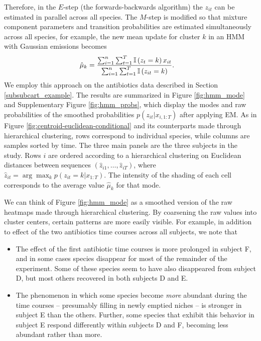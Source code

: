 \documentclass[14pt]{extarticle}
\begin{document}
Therefore, in the $E$-step (the forwards-backwards algorithm) the $z_{it}$ can
be estimated in parallel across all species. The $M$-step is modified so that
mixture component parameters and transition probabilities are estimated
simultaneously across all species, for example, the new mean update for cluster
$k$ in an HMM with Gaussian emissions becomes
\begin{align*}
\hat{\mu}_{k} &= \frac{\sum_{i = 1}^{n}\sum_{t = 1}^{T} \mathbb{I}\left({z_{t} = k}\right)x_{it}}{\sum_{i = 1}^{n}\sum_{t = 1}^{T} \mathbb{I}\left({z_{it} = k}\right)}.
\end{align*}
We employ this approach on the antibiotics data described in Section
\ref{subsubcart_example}. The results are summarized in Figure
\ref{fig:hmm_mode} and Supplementary Figure \ref{fig:hmm_probs}, which display
the modes and raw probabilities of the smoothed probabilities $p\left(z_{it}
\vert x_{i, 1:T}\right)$ after applying EM. As in Figure
\ref{fig:centroid-euclidean-conditional} and its counterparts made through
hierarchical clustering, rows correspond to individual species, while columns
are samples sorted by time. The three main panels are the three subjects in the
study. Rows $i$ are ordered according to a hierarchical clustering on Euclidean
distances between sequences $\left(\hat{z}_{i1}, \dots, \hat{z}_{iT}\right)$,
where $\hat{z}_{it} = \arg \max_{k} p\left(z_{it} = k \vert x_{1:T}\right)$. The
intensity of the shading of each cell corresponds to the average value
$\hat{\mu}_{k}$ for that mode.

We can think of Figure \ref{fig:hmm_mode} as a smoothed version of the raw
heatmaps made through hierarchical clustering. By coarsening the raw values into
cluster centers, certain patterns are more easily visible. For example, in
addition to effect of the two antibiotics time courses across all subjects, we
note that

\begin{itemize}
\item The effect of the first antibiotic time courses is more prolonged in
  subject F, and in some cases species disappear for most of the remainder of
  the experiment. Some of these species seem to have also disappeared from
  subject D, but most others recovered in both subjects D and E.
\item The phenomenon in which some species become \textit{more} abundant during
  the time courses -- presumably filling in newly emptied niches -- is stronger
  in subject E than the others. Further, some species that exhibit this behavior
  in subject E respond differently within subjects D and F, becoming less
  abundant rather than more.
\end{itemize}
\end{document}
